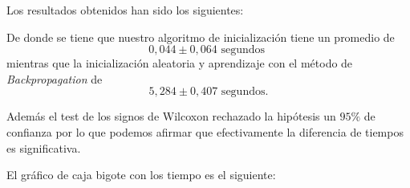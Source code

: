 Los resultados obtenidos han sido los siguientes: 

\begin{table}[H]
    \centering
    \caption{Tiempos en segundos hasta parada empleado por cada algoritmo en las sucesivas iteraciones }
\end{table}



De donde se tiene que nuestro algoritmo de inicialización tiene un promedio de 
\begin{equation}
    0,044 \pm 0,064 \text{ segundos }
\end{equation}
mientras que la inicialización aleatoria y aprendizaje con el método de 
\textit{Backpropagation} de 
\begin{equation}
    5,284 \pm 0,407   \text{ segundos}.
\end{equation}

Además el test de los signos de Wilcoxon rechazado la hipótesis un $95\%$ de confianza
por lo que podemos afirmar que efectivamente la diferencia de tiempos es significativa. 

El gráfico de caja bigote con los tiempo es el siguiente: 


